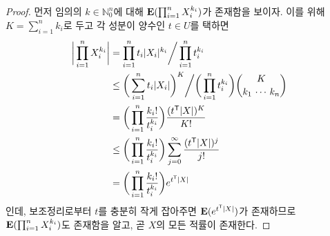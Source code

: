 \begin{proof}
    먼저 임의의 $k\in\mathbb{N}_0^n$에 대해 $\mathbf{E}(\prod_{i=1}^nX_i^{k_i})$가 존재함을 보이자. 이를 위해 $K=\sum_{i=1}^nk_i$로 두고 각 성분이 양수인 $t\in U$를 택하면
    \begin{align*}
        \bigg|\prod_{i=1}^nX_i^{k_i}\bigg|&=\prod_{i=1}^nt_i|X_i|^{k_i}\bigg/\prod_{i=1}^nt_i^{k_i}\\
        &\leq\bigg(\sum_{i=1}^nt_i|X_i|\bigg)^K\bigg/\bigg(\prod_{i=1}^nt_i^{k_i}\bigg)\binom{K}{k_1\,\cdots\,k_n}\\
        &=\bigg(\prod_{i=1}^n\frac{k_i!}{t_i^{k_i}}\bigg)\frac{(t^{\mathsf{T}}|X|)^K}{K!}\\
        &\leq\bigg(\prod_{i=1}^n\frac{k_i!}{t_i^{k_i}}\bigg)\sum_{j=0}^\infty\frac{(t^{\mathsf{T}}|X|)^j}{j!}\\
        &=\bigg(\prod_{i=1}^n\frac{k_i!}{t_i^{k_i}}\bigg)e^{t^{\mathsf{T}}|X|}
    \end{align*}
    인데, 보조정리로부터 $t$를 충분히 작게 잡아주면 $\mathbf{E}(e^{t^{\mathsf{T}}|X|})$가 존재하므로 $\mathbf{E}(\prod_{i=1}^nX_i^{k_i})$도 존재함을 알고, 곧 $X$의 모든 적률이 존재한다.


\end{proof}
